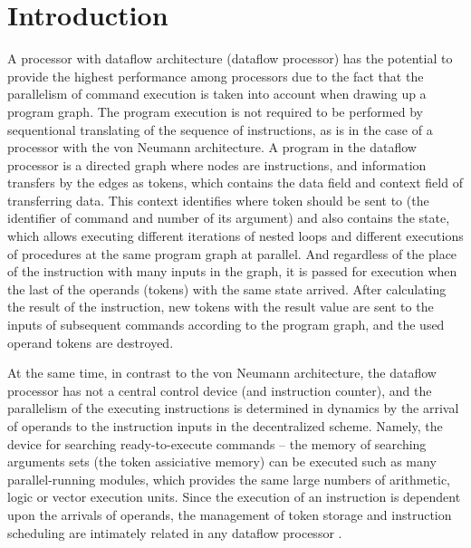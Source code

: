 \documentclass[
11pt,%
tightenlines,%
twoside,%
onecolumn,%
nofloats,%
nobibnotes,%
nofootinbib,%
superscriptaddress,%
noshowpacs,%
centertags]%
{revtex4}
\begin{document}


\maketitle

\section{Introduction}

A processor with dataflow architecture (dataflow processor) has the potential to provide the highest performance among processors due to the fact that the parallelism of command execution is taken into account when drawing up a program graph.
The program execution is not required to be performed by sequentional translating of the sequence of instructions, as is in the case of a processor with the von Neumann architecture.
A program in the dataflow processor is a directed graph where nodes are instructions, and information transfers by the edges as tokens, which contains the data field and context field of transferring data.
This context identifies where token should be sent to (the identifier of command and number of its argument) and also contains the state, which allows executing different iterations of nested loops and different executions of procedures at the same program graph at parallel.
And regardless of the place of the instruction with many inputs in the graph, it is passed for execution when the last of the operands (tokens) with the same state arrived.
After calculating the result of the instruction, new tokens with the result value are sent to the inputs of subsequent commands according to the program graph, and the used operand tokens are destroyed.

At the same time, in contrast to the von Neumann architecture, the dataflow processor has not a central control device (and instruction counter), and the parallelism of the executing instructions is determined in dynamics by the arrival of operands to the instruction inputs in the decentralized scheme.
Namely, the device for searching ready-to-execute commands -- the memory of searching arguments sets (the token assiciative memory) can be executed such as many parallel-running modules, which provides the same large numbers of arithmetic, logic or vector execution units.
Since the execution of an instruction is dependent upon the arrivals of operands, the management of token storage and instruction scheduling are intimately related in any dataflow processor \cite{fine-grained-prl,culler}.
\end{document}

